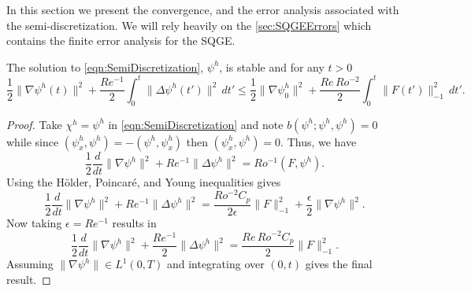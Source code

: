 In this section we present the convergence, and the error analysis associated
with the semi-discretization. We will rely heavily on the
\autoref{sec:SQGEErrors} which contains the finite error analysis for the SQGE.

\begin{prop} \label{prop:Stability}
  The solution to \eqref{eqn:SemiDiscretization}, $\psi^h$, is stable and for
  any $t>0$
  \begin{equation}
    \frac{1}{2}\|\nabla \psi^h(t)\|^2 + \frac{Re^{-1}}{2}\int_{0}^{t}\! \|\Delta
      \psi^h(t')\|^2 \, dt' \le \frac{1}{2} \|\nabla \psi^h_0\|^2
      + \frac{Re\, Ro^{-2}}{2} \int_{0}^{t}\! \|F(t')\|^2_{-1}\, dt'.
    \label{eqn:Stability}
  \end{equation}
\end{prop}
\begin{proof}
  Take $\chi^h = \psi^h$ in \eqref{eqn:SemiDiscretization} and note
  $b(\psi^h;\psi^h,\psi^h)
  = 0$ while since $(\psi^h_x,\psi^h) = -(\psi^h,\psi^h_x)$ then $(\psi^h_x,
  \psi^h) = 0$. Thus, we have
  \begin{equation*}
    \frac{1}{2} \frac{d}{dt} \|\nabla \psi^h\|^2 + Re^{-1} \|\Delta \psi^h\|^2 =
      Ro^{-1} (F,\psi^h).
  \end{equation*}
  Using the H\"older, Poincar\'e, and Young inequalities gives
  \begin{equation*}
    \frac{1}{2} \frac{d}{dt} \|\nabla \psi^h\|^2 + Re^{-1} \|\Delta \psi^h\|^2 =
      \frac{Ro^{-2} C_p}{2\epsilon} \|F\|_{-1}^2 + \frac{\epsilon}{2}\|\nabla
      \psi^h\|^2.
  \end{equation*}
  Now taking $\epsilon = Re^{-1}$ results in
  \begin{equation*}
    \frac{1}{2} \frac{d}{dt} \|\nabla \psi^h\|^2 + \frac{Re^{-1}}{2} \|\Delta
      \psi^h\|^2 = \frac{Re\,Ro^{-2} C_p}{2} \|F\|_{-1}^2.
  \end{equation*}
  Assuming $\|\nabla \psi^h\| \in L^1(0,T)$ and integrating over $(0,t)$ gives
  the final result.
\end{proof}

